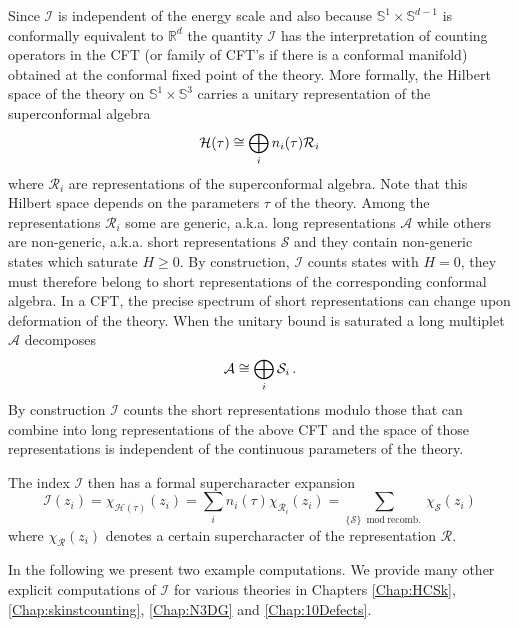 \documentclass[main.tex]{subfiles}
\begin{document}
Since $\mathcal{I}$ is independent of the energy scale and also because $\mathbb{S}^1\times\mathbb{S}^{d-1}$ is conformally equivalent to $\mathbb{R}^d$ the quantity $\mathcal{I}$ has the interpretation of counting operators in the CFT (or family of CFT's if there is a conformal manifold) obtained at the conformal fixed point of the theory. More formally, the Hilbert space of the theory on $\mathbb{S}^1\times\mathbb{S}^3$ carries a unitary representation of the superconformal algebra
\begin{equation}
\mathcal{H}(\tau)\cong\bigoplus_in_i(\tau)\mathcal{R}_i
\end{equation}
where $\mathcal{R}_i$ are representations of the superconformal algebra. Note that this Hilbert space depends on the parameters $\tau$ of the theory.  
Among the representations $\mathcal{R}_i$ some are generic, a.k.a.  long representations $\mathcal{A}$ while others are non-generic, a.k.a. short representations $\mathcal{S}$ and they contain non-generic states which saturate $H\geq0$. By construction, $\mathcal{I}$ counts states with $H=0$, they must therefore belong to short representations of the corresponding conformal algebra.  In a CFT, the precise spectrum of short representations can change upon deformation of the theory. When the unitary bound is saturated a long multiplet $\mathcal{A}$ decomposes 
\begin{equation}
\mathcal{A}\cong\bigoplus_i\mathcal{S}_i\,.
\end{equation}
By construction $\mathcal{I}$ counts the short representations modulo those that can combine into long representations of the above CFT and the space of those representations is independent of the continuous parameters of the theory.  

The index $\mathcal{I}$ then has a formal supercharacter expansion
\begin{equation}
\mathcal{I}(z_i)=\chi_{\mathcal{H}(\tau)}(z_i)=\sum_in_i(\tau)\chi_{\mathcal{R}_i}(z_i)=\sum_{\{\mathcal{S}\}\bmod\text{recomb.}}\chi_{\mathcal{S}}(z_i)
\end{equation}
where $\chi_{\mathcal{R}}(z_i)$ denotes a certain supercharacter of the representation $\mathcal{R}$.

In the following we present two example computations.  We provide many other explicit computations of $\mathcal{I}$ for various theories in Chapters \ref{Chap:HCSk}, \ref{Chap:skinstcounting}, \ref{Chap:N3DG} and \ref{Chap:10Defects}.  
\end{document}
